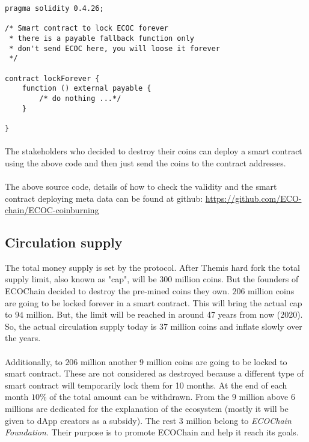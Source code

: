 \documentclass{article}
\begin{document}


\begin{lstlisting}[language=Solidity]
pragma solidity 0.4.26;

/* Smart contract to lock ECOC forever 
 * there is a payable fallback function only
 * don't send ECOC here, you will loose it forever
 */
 
contract lockForever {
    function () external payable {
        /* do nothing ...*/
    }

}
\end{lstlisting}

\paragraph{}
The stakeholders who decided to destroy their coins can deploy a smart contract using the above code and then just send the coins to the contract addresses.
\paragraph{}
The above source code, details of how to check the validity and the smart contract deploying meta data can be found at github: \url{https://github.com/ECO-chain/ECOC-coinburning}

\subsection{Circulation supply}
The total money supply is set by the protocol. After Themis hard fork the total supply limit, also known as "cap", will be $300$ million coins. But the founders of ECOChain decided to destroy the pre-mined coins they own. $206$ million coins are going to be locked forever in a smart contract. This will bring the actual cap to $94$ million. But, the limit will be reached in around 47 years from now (2020). So, the actual circulation supply today is $37$ million coins and inflate slowly over the years.
\paragraph{}
Additionally, to $206$ million another $9$ million coins are going to be locked to smart contract. These are not considered as destroyed because a different type of smart contract will temporarily lock them for 10 months. At the end of each month $10\%$ of the total amount can be withdrawn. From the $9$ million above $6$ millions are dedicated for the explanation of the ecosystem (mostly it will be given to dApp creators as a subsidy). The rest $3$ million belong to \emph{ECOChain Foundation}. Their purpose is to promote ECOChain and help it reach its goals. 
\end{document}
